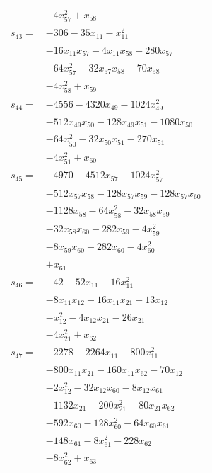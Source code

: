 \begin{longtable}{@{}r@{\;}l@{}}
 & \(\displaystyle -4x_{57}^{2} +x_{58}\) \\[3pt]
\(s_{43}=\) & \(\displaystyle -306 -35x_{11} -x_{11}^{2}\) \\
 & \(\displaystyle -16x_{11}x_{57} -4x_{11}x_{58} -280x_{57}\) \\
 & \(\displaystyle -64x_{57}^{2} -32x_{57}x_{58} -70x_{58}\) \\
 & \(\displaystyle -4x_{58}^{2} +x_{59}\) \\[3pt]
\(s_{44}=\) & \(\displaystyle -4556 -4320x_{49} -1024x_{49}^{2}\) \\
 & \(\displaystyle -512x_{49}x_{50} -128x_{49}x_{51} -1080x_{50}\) \\
 & \(\displaystyle -64x_{50}^{2} -32x_{50}x_{51} -270x_{51}\) \\
 & \(\displaystyle -4x_{51}^{2} +x_{60}\) \\[3pt]
\(s_{45}=\) & \(\displaystyle -4970 -4512x_{57} -1024x_{57}^{2}\) \\
 & \(\displaystyle -512x_{57}x_{58} -128x_{57}x_{59} -128x_{57}x_{60}\) \\
 & \(\displaystyle -1128x_{58} -64x_{58}^{2} -32x_{58}x_{59}\) \\
 & \(\displaystyle -32x_{58}x_{60} -282x_{59} -4x_{59}^{2}\) \\
 & \(\displaystyle -8x_{59}x_{60} -282x_{60} -4x_{60}^{2}\) \\
 & \(\displaystyle +x_{61}\) \\[3pt]
\(s_{46}=\) & \(\displaystyle -42 -52x_{11} -16x_{11}^{2}\) \\
 & \(\displaystyle -8x_{11}x_{12} -16x_{11}x_{21} -13x_{12}\) \\
 & \(\displaystyle -x_{12}^{2} -4x_{12}x_{21} -26x_{21}\) \\
 & \(\displaystyle -4x_{21}^{2} +x_{62}\) \\[3pt]
\(s_{47}=\) & \(\displaystyle -2278 -2264x_{11} -800x_{11}^{2}\) \\
 & \(\displaystyle -800x_{11}x_{21} -160x_{11}x_{62} -70x_{12}\) \\
 & \(\displaystyle -2x_{12}^{2} -32x_{12}x_{60} -8x_{12}x_{61}\) \\
 & \(\displaystyle -1132x_{21} -200x_{21}^{2} -80x_{21}x_{62}\) \\
 & \(\displaystyle -592x_{60} -128x_{60}^{2} -64x_{60}x_{61}\) \\
 & \(\displaystyle -148x_{61} -8x_{61}^{2} -228x_{62}\) \\
 & \(\displaystyle -8x_{62}^{2} +x_{63}\) \\[3pt]

\end{longtable}
